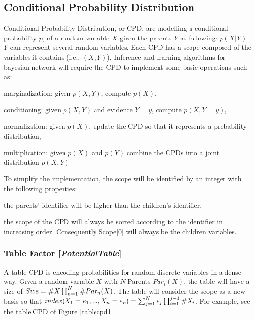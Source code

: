 \documentclass[11pt]{article}
\newcommand{\nllref}[1]{[\small{\textit{#1}}]}
\newcommand{\counta}[1]{\small{\#}#1}
\begin{document}
\subsection{Conditional Probability Distribution}
Conditional Probability Distribution, or CPD, are modelling a conditional probability $p$, of a random variable $X$ given the parents $Y$ as following: $p(X|Y)$. $Y$ can represent several random variables. Each CPD has a scope composed of the variables it contains (i.e., $(X,Y)$). Inference and learning algorithms for bayesian network will require the CPD to implement some basic operations such as:
\begin{compactitem}
\item marginalization: given $p(X,Y)$, compute $p(X)$,
\item conditioning: given $p(X,Y)$ and evidence $Y=y$, compute $p(X,Y=y)$,
\item normalization: given $p(X)$, update the CPD so that it represents a probability distribution,
\item multiplication: given $p(X)$ and $p(Y)$ combine the CPDs into a joint distribution $p(X,Y)$
\end{compactitem}

To simplify the implementation, the scope will be identified by an integer with the following properties:
\begin{compactitem}
\item the parents' identifier will be higher than the children's identifier,
\item the scope of the CPD will always be sorted according to the identifier in increasing order. Consequently Scope[0] will always be the children variables.
\end{compactitem}

\subsubsection{Table Factor \nllref{PotentialTable}}
A table CPD is encoding probabilities for random discrete variables in a dense way. Given a random variable $X$ with $N$ Parents $Par_i(X)$, the table will have a size of $Size=\counta{X}\prod_{n=1}^{N} \counta{Par_n(X)}$. The table will consider the scope as a new basis so that $index(X_1=e_1, ..., X_n=e_n)=\sum_{j=1}^N e_j \prod_{i=1}^{j-1}\counta{X_i} $. For example, see the table CPD of Figure \ref{tablecpd1}.
\end{document}
